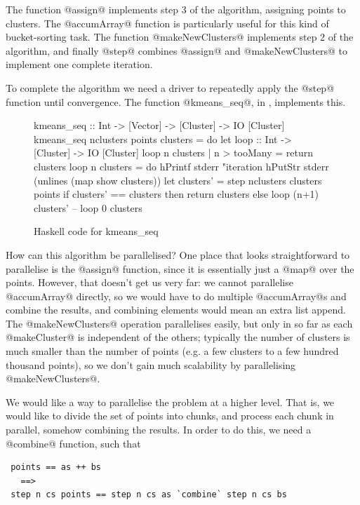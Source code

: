 The function @assign@ implements step 3 of the algorithm, assigning
points to clusters.  The @accumArray@ function is particularly useful
for this kind of bucket-sorting task.  The function @makeNewClusters@
implements step 2 of the algorithm, and finally @step@ combines
@assign@ and @makeNewClusters@ to implement one complete iteration.

To complete the algorithm we need a driver to repeatedly apply the @step@
function until convergence. The function @kmeans_seq@, in
, implements this.

\begin{figure}
\begin{haskell}
kmeans_seq :: Int -> [Vector] -> [Cluster] -> IO [Cluster]
kmeans_seq nclusters points clusters = do
  let
      loop :: Int -> [Cluster] -> IO [Cluster]
      loop n clusters | n > tooMany = return clusters
      loop n clusters = do
        hPrintf stderr "iteration %
        hPutStr stderr (unlines (map show clusters))
        let clusters' = step nclusters clusters points
        if clusters' == clusters
           then return clusters
           else loop (n+1) clusters'
  --
  loop 0 clusters
\end{haskell}
\caption{Haskell code for kmeans\_seq}
\label{fig:kmeans_seq}
\end{figure}

How can this algorithm be parallelised?  One place that looks
straightforward to parallelise is the @assign@ function, since it is
essentially just a @map@ over the points.  However, that doesn't get
us very far: we cannot parallelise @accumArray@ directly, so we would
have to do multiple @accumArray@s and combine the results, and
combining elements would mean an extra list append.  The
@makeNewClusters@ operation parallelises easily, but only in so far as
each @makeCluster@ is independent of the others; typically the number
of clusters is much smaller than the number of points (e.g. a few
clusters to a few hundred thousand points), so we don't gain much
scalability by parallelising @makeNewClusters@.

We would like a way to parallelise the problem at a higher level.
That is, we would like to divide the set of points into chunks, and
process each chunk in parallel, somehow combining the results.  In
order to do this, we need a @combine@ function, such that

{\small \begin{verbatim}
 points == as ++ bs
   ==>
 step n cs points == step n cs as `combine` step n cs bs
\end{verbatim}}

